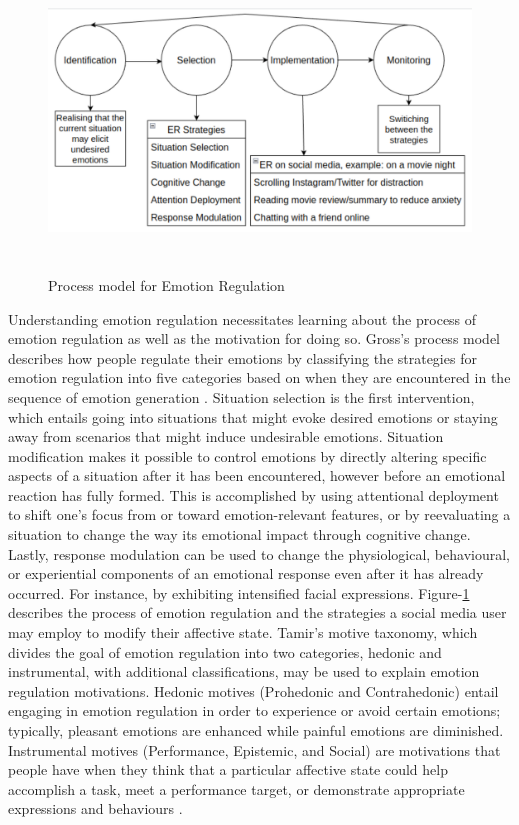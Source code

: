 \documentclass[lettersize,journal]{IEEEtran}
\begin{document}
\begin{figure}[h]
  
    \centering
    \includegraphics[width=14cm,height=8cm,keepaspectratio]{ERmodel.pdf}
  \caption{Process model for Emotion Regulation}
  \label{fig:Process}
  \end{figure}
Understanding emotion regulation necessitates learning about the process of emotion regulation as well as the motivation for doing so. Gross's process model describes how people regulate their emotions by classifying the strategies for emotion regulation into five categories based on when they are encountered in the sequence of emotion generation \cite{wadley2020digital}. Situation selection is the first intervention, which entails going into situations that might evoke desired emotions or staying away from scenarios that might induce undesirable emotions. Situation modification makes it possible to control emotions by directly altering specific aspects of a situation after it has been encountered, however before an emotional reaction has fully formed. This is accomplished by using attentional deployment to shift one's focus from or toward emotion-relevant features, or by reevaluating a situation to change the way its emotional impact through cognitive change. Lastly, response modulation can be used to change the physiological, behavioural, or experiential components of an emotional response even after it has already occurred. For instance, by exhibiting intensified facial expressions. Figure-\ref{fig:Process} describes the process of emotion regulation and the strategies a social media user may employ to modify their affective state. Tamir's motive taxonomy, which divides the goal of emotion regulation into two categories, hedonic and instrumental, with additional classifications, may be used to explain emotion regulation motivations. Hedonic motives (Prohedonic and Contrahedonic) entail engaging in emotion regulation in order to experience or avoid certain emotions; typically, pleasant emotions are enhanced while painful emotions are diminished. Instrumental motives (Performance, Epistemic, and Social) are motivations that people have when they think that a particular affective state could help accomplish a task, meet a performance target, or demonstrate appropriate expressions and behaviours \cite{wadley2020digital}.
\end{document}
